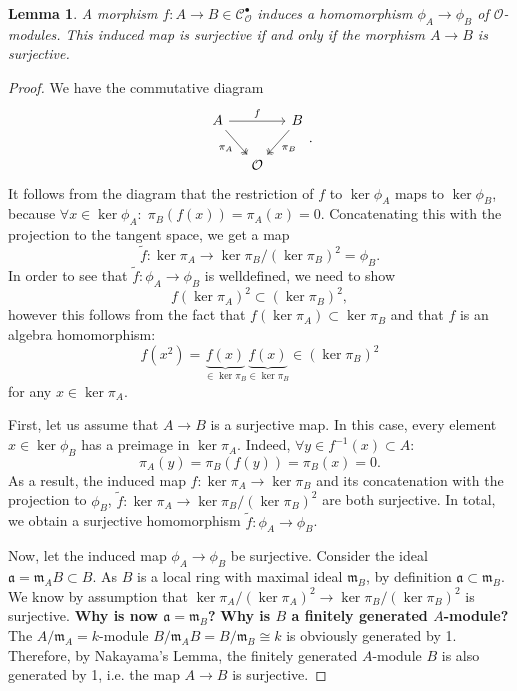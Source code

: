 \documentclass{article}
\theoremstyle{plain}%
\newtheorem{lemma}{Lemma}[section]
\theoremstyle{definition}
\theoremstyle{remark}
\newcommand{\cob}{\mathcal{C}_\mathcal{O}^\bullet}
\begin{document}
    \begin{lemma}\label{lem:surjectivity_phi}
        A morphism \(f\colon A \to B \in \cob\) induces a homomorphism \(\phi_A \to \phi_B\) of \(\mathcal{O}\)-modules.
        This induced map is surjective if and only if the morphism \(A \to B\) is surjective.
    \end{lemma}
    \begin{proof}
        We have the commutative diagram
        \[
        \begin{tikzcd}[column sep=small]
            A \arrow[rr, "f"] \arrow [dr, "\pi_A", swap, twoheadrightarrow] & & B \arrow [dl, "\pi_B", twoheadrightarrow]\\
            & \mathcal{O} &
        \end{tikzcd}.
        \]
        It follows from the diagram that the restriction of \(f\) to \(\ker \phi_A\) maps to \(\ker \phi_B\),
        because \(\forall x \in \ker \phi_A\colon\; \pi_B(f(x)) = \pi_A(x) = 0\).
        Concatenating this with the projection to the tangent space, we get a map
        \[
            \tilde f\colon \ker \pi_A \to \ker \pi_B/(\ker \pi_B)^2 = \phi_B.
        \]
        In order to see that \(\tilde f\colon \phi_A \to \phi_B\) is welldefined, we need to show 
        \[
            f(\ker \pi_A)^2 \subset (\ker \pi_B)^2,
        \]
        however this follows from the fact that \(f(\ker \pi_A) \subset \ker \pi_B\) and that \(f\) is an algebra
        homomorphism:
        \[
            f(x^2) = \underbrace{f(x)}_{\in \ker \pi_B}\underbrace{f(x)}_{\in \ker \pi_B} \in (\ker \pi_B)^2 
        \]
        for any \(x \in \ker \pi_A\).

        First, let us assume that \(A \to B\) is a surjective map.
        In this case, every element \(x \in \ker \phi_B\) has a preimage in \(\ker \pi_A\). Indeed, \(\forall y \in f^{-1}(x)\subset A\colon\)
        \[
            \pi_A(y) = \pi_B(f(y)) = \pi_B(x) = 0.
        \]
        As a result, the induced map \(f\colon \ker \pi_A \to \ker \pi_B\) and its concatenation with
        the projection to \(\phi_B\), \(\tilde f\colon \ker \pi_A \to \ker \pi_B/(\ker \pi_B)^2\) are both surjective.
        In total, we obtain a surjective homomorphism \(\tilde f\colon \phi_A \to \phi_B\).
        
        Now, let the induced map \(\phi_A \to \phi_B\) be surjective. 
        Consider the ideal \(\mathfrak{a} = \mathfrak{m}_A B \subset B\). As \(B\) is a local ring
        with maximal ideal \(\mathfrak{m}_B\), by definition \(\mathfrak{a} \subset \mathfrak{m}_B\).
        We know by assumption that \(\ker \pi_A/(\ker \pi_A)^2 \to \ker \pi_B/(\ker \pi_B)^2\) is surjective.
        \textbf{Why is now \(\mathfrak{a} = \mathfrak{m}_B\)?}
        \textbf{Why is \(B\) a finitely generated \(A\)-module?}
        The \(A/\mathfrak{m}_A = k\)-module \(B/\mathfrak{m}_A B = B/\mathfrak{m}_B \cong k\)
        is obviously generated by 1. 
        Therefore, by Nakayama's Lemma, the finitely generated \(A\)-module \(B\) is
        also generated by 1, i.e. the map \(A \to B\) is surjective.
    \end{proof}
\end{document}

